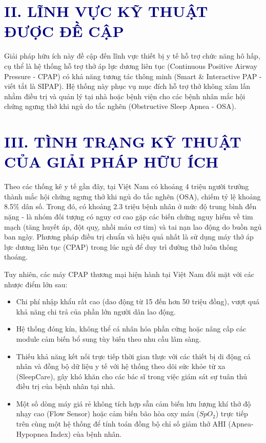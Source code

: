 \documentclass[12pt,a4paper]{article}
\begin{document}
\section{\textcolor{navy}{II. LĨNH VỰC KỸ THUẬT ĐƯỢC ĐỀ CẬP}}
Giải pháp hữu ích này đề cập đến lĩnh vực thiết bị y tế hỗ trợ chức năng hô hấp, cụ thể là hệ thống hỗ trợ thở áp lực dương liên tục (Continuous Positive Airway Pressure - CPAP) có khả năng tương tác thông minh (Smart \& Interactive PAP - viết tắt là SIPAP). Hệ thống này phục vụ mục đích hỗ trợ thở không xâm lấn nhằm điều trị và quản lý tại nhà hoặc bệnh viện cho các bệnh nhân mắc hội chứng ngưng thở khi ngủ do tắc nghẽn (Obstructive Sleep Apnea - OSA).

\section{\textcolor{navy}{III. TÌNH TRẠNG KỸ THUẬT CỦA GIẢI PHÁP HỮU ÍCH}}
Theo các thống kê y tế gần đây, tại Việt Nam có khoảng 4 triệu người trưởng thành mắc hội chứng ngưng thở khi ngủ do tắc nghẽn (OSA), chiếm tỷ lệ khoảng 8.5\% dân số. Trong đó, có khoảng 2.3 triệu bệnh nhân ở mức độ trung bình đến nặng - là nhóm đối tượng có nguy cơ cao gặp các biến chứng nguy hiểm về tim mạch (tăng huyết áp, đột quỵ, nhồi máu cơ tim) và tai nạn lao động do buồn ngủ ban ngày. Phương pháp điều trị chuẩn và hiệu quả nhất là sử dụng máy thở áp lực dương liên tục (CPAP) trong lúc ngủ để duy trì đường thở luôn thông thoáng.

Tuy nhiên, các máy CPAP thương mại hiện hành tại Việt Nam đối mặt với các nhược điểm lớn sau:
\begin{itemize}
    \item Chi phí nhập khẩu rất cao (dao động từ 15 đến hơn 50 triệu đồng), vượt quá khả năng chi trả của phần lớn người dân lao động.
    \item Hệ thống đóng kín, không thể cá nhân hóa phần cứng hoặc nâng cấp các module cảm biến bổ sung tùy biến theo nhu cầu lâm sàng.
    \item Thiếu khả năng kết nối trực tiếp thời gian thực với các thiết bị di động cá nhân và đồng bộ dữ liệu y tế với hệ thống theo dõi sức khỏe từ xa (SleepCare), gây khó khăn cho các bác sĩ trong việc giám sát sự tuân thủ điều trị của bệnh nhân tại nhà.
    \item Một số dòng máy giá rẻ không tích hợp sẵn cảm biến lưu lượng khí thở độ nhạy cao (Flow Sensor) hoặc cảm biến bão hòa oxy máu ($SpO_2$) trực tiếp trên cùng một hệ thống để tính toán đồng bộ chỉ số giảm thở AHI (Apnea-Hypopnea Index) của bệnh nhân.
\end{itemize}
\end{document}
